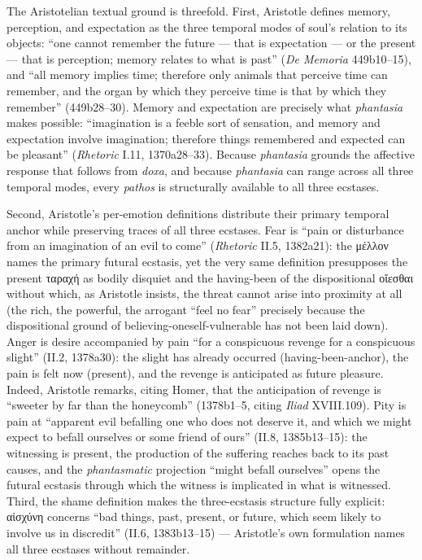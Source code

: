 \documentclass{article}
\newcommand{\gk}[1]{{\greekfont #1}}
\begin{document}
The Aristotelian textual ground is threefold. First, Aristotle defines memory, perception, and expectation as the three temporal modes of soul's relation to its objects: ``one cannot remember the future --- that is expectation --- or the present --- that is perception; memory relates to what is past'' (\textit{De Memoria} 449b10--15), and ``all memory implies time; therefore only animals that perceive time can remember, and the organ by which they perceive time is that by which they remember'' (449b28--30). Memory and expectation are precisely what \textit{phantasia} makes possible: ``imagination is a feeble sort of sensation, and memory and expectation involve imagination; therefore things remembered and expected can be pleasant'' (\textit{Rhetoric} I.11, 1370a28--33). Because \textit{phantasia} grounds the affective response that follows from \textit{doxa}, and because \textit{phantasia} can range across all three temporal modes, every \textit{pathos} is structurally available to all three ecstases.

Second, Aristotle's per-emotion definitions distribute their primary temporal anchor while preserving traces of all three ecstases. Fear is ``pain or disturbance from an imagination of an evil to come'' (\textit{Rhetoric} II.5, 1382a21): the \gk{μέλλον} names the primary futural ecstasis, yet the very same definition presupposes the present \gk{ταραχή} as bodily disquiet and the having-been of the dispositional \gk{οἴεσθαι} without which, as Aristotle insists, the threat cannot arise into proximity at all (the rich, the powerful, the arrogant ``feel no fear'' precisely because the dispositional ground of believing-oneself-vulnerable has not been laid down). Anger is desire accompanied by pain ``for a conspicuous revenge for a conspicuous slight'' (II.2, 1378a30): the slight has already occurred (having-been-anchor), the pain is felt now (present), and the revenge is anticipated as future pleasure. Indeed, Aristotle remarks, citing Homer, that the anticipation of revenge is ``sweeter by far than the honeycomb'' (1378b1--5, citing \textit{Iliad} XVIII.109). Pity is pain at ``apparent evil befalling one who does not deserve it, and which we might expect to befall ourselves or some friend of ours'' (II.8, 1385b13--15): the witnessing is present, the production of the suffering reaches back to its past causes, and the \textit{phantasmatic} projection ``might befall ourselves'' opens the futural ecstasis through which the witness is implicated in what is witnessed. Third, the shame definition makes the three-ecstasis structure fully explicit: \gk{αἰσχύνη} concerns ``bad things, past, present, or future, which seem likely to involve us in discredit'' (II.6, 1383b13--15) --- Aristotle's own formulation names all three ecstases without remainder.
\end{document}
